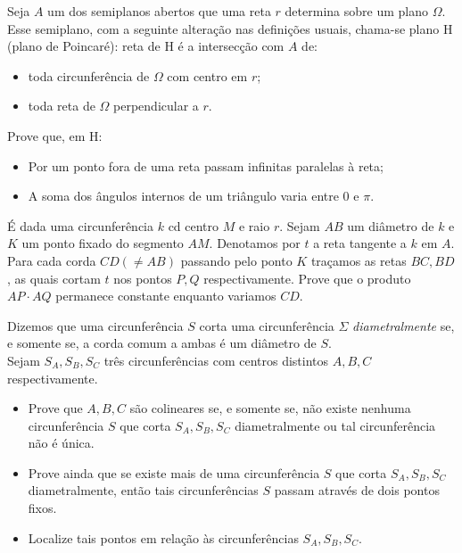 \begin{questao}
  Seja $A$ um dos semiplanos abertos que uma reta $r$
  determina sobre um plano $\Omega$. Esse semiplano, com a seguinte
  alteração nas definições usuais, chama-se plano H (plano de
  Poincaré): reta de H é a intersecção com $A$ de:
  \begin{itemize}
    \item toda circunferência de $\Omega$ com centro em $r$;

    \item toda reta de $\Omega$ perpendicular a $r$.
  \end{itemize}

  Prove que, em H:
  \begin{itemize}
    \item Por um ponto fora de uma reta passam infinitas paralelas à
    reta;

    \item A soma dos ângulos internos de um triângulo varia entre
    $0$ e $\pi$.
  \end{itemize}
\end{questao}

\begin{questao}
  É dada uma circunferência $k$ cd centro $M$ e raio
  $r$. Sejam $AB$ um diâmetro de $k$ e $K$ um ponto fixado do
  segmento $AM$. Denotamos por $t$ a reta tangente a $k$ em
  $A$. Para cada corda $CD (\not = AB)$ passando pelo ponto $K$
  traçamos as retas $BC,BD$, as quais cortam $t$ nos pontos
  $P,Q$ respectivamente. Prove que o produto $AP \cdot AQ$
  permanece constante enquanto variamos $CD$.
\end{questao}

\begin{questao}
  Dizemos que uma circunferência $S$ corta uma
  circunferência $\Sigma$ {\it diametralmente} se, e somente se, a
  corda comum a ambas é um diâmetro de $S$.\\
  Sejam $S_A,S_B,S_C$ três circunferências com centros distintos
  $A,B,C$ respectivamente.
  \begin{itemize}
    \item Prove que $A,B,C$
    são colineares se, e somente se, não existe nenhuma circunferência
    $S$ que corta $S_A,S_B,S_C$ diametralmente ou tal
    circunferência não é única.

    \item Prove ainda que se existe mais de uma circunferência $S$
    que corta $S_A,S_B,S_C$ diametralmente, então tais
    circunferências $S$ passam através de dois pontos fixos.

    \item Localize tais pontos em relação às circunferências
    $S_A,S_B,S_C$.
  \end{itemize}
\end{questao}

